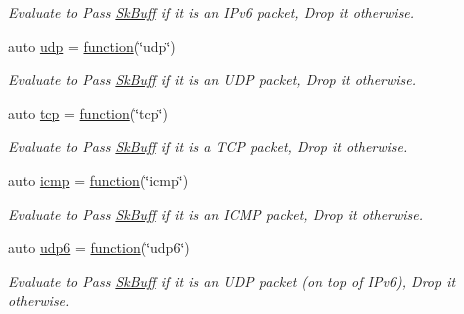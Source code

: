 \begin{DoxyCompactItemize}
\begin{DoxyCompactList}\small\item\em Evaluate to {\ttfamily Pass} \hyperlink{structpfq_1_1lang_1_1SkBuff}{Sk\+Buff} if it is an I\+Pv6 packet, {\ttfamily Drop} it otherwise. \end{DoxyCompactList}\item 
auto \hyperlink{namespacepfq_1_1lang_1_1anonymous__namespace_02default_8hpp_03_a0b8b927aad3be7034521ebde0dabf7d3}{udp} = \hyperlink{namespacepfq_1_1lang_a1a4638059d700ae08d0ca63886ff2bb3}{function}(\char`\"{}udp\char`\"{})
\begin{DoxyCompactList}\small\item\em Evaluate to {\ttfamily Pass} \hyperlink{structpfq_1_1lang_1_1SkBuff}{Sk\+Buff} if it is an U\+DP packet, {\ttfamily Drop} it otherwise. \end{DoxyCompactList}\item 
auto \hyperlink{namespacepfq_1_1lang_1_1anonymous__namespace_02default_8hpp_03_a5b8ca91a33a120e7e0807e63c8b51b28}{tcp} = \hyperlink{namespacepfq_1_1lang_a1a4638059d700ae08d0ca63886ff2bb3}{function}(\char`\"{}tcp\char`\"{})
\begin{DoxyCompactList}\small\item\em Evaluate to {\ttfamily Pass} \hyperlink{structpfq_1_1lang_1_1SkBuff}{Sk\+Buff} if it is a T\+CP packet, {\ttfamily Drop} it otherwise. \end{DoxyCompactList}\item 
auto \hyperlink{namespacepfq_1_1lang_1_1anonymous__namespace_02default_8hpp_03_a3becf93771a800904f002e39b1cc388f}{icmp} = \hyperlink{namespacepfq_1_1lang_a1a4638059d700ae08d0ca63886ff2bb3}{function}(\char`\"{}icmp\char`\"{})
\begin{DoxyCompactList}\small\item\em Evaluate to {\ttfamily Pass} \hyperlink{structpfq_1_1lang_1_1SkBuff}{Sk\+Buff} if it is an I\+C\+MP packet, {\ttfamily Drop} it otherwise. \end{DoxyCompactList}\item 
auto \hyperlink{namespacepfq_1_1lang_1_1anonymous__namespace_02default_8hpp_03_a37f7f4eb5cff8508b956eba7dee75a45}{udp6} = \hyperlink{namespacepfq_1_1lang_a1a4638059d700ae08d0ca63886ff2bb3}{function}(\char`\"{}udp6\char`\"{})
\begin{DoxyCompactList}\small\item\em Evaluate to {\ttfamily Pass} \hyperlink{structpfq_1_1lang_1_1SkBuff}{Sk\+Buff} if it is an U\+DP packet (on top of I\+Pv6), {\ttfamily Drop} it otherwise. \end{DoxyCompactList}\item 

\end{DoxyCompactItemize}
